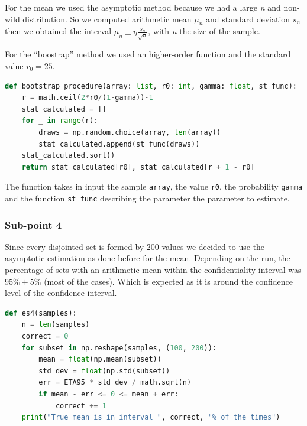\documentclass[10pt,a4paper]{article}
\begin{document}
For the mean we used the asymptotic method because we had a large \emph{n} and non-wild distribution. So we computed arithmetic mean \(\mu_{n}\) and standard deviation \(s_{n}\) then we obtained the interval \(\mu_{n}\pm \eta\frac{s_{n}}{\sqrt{n}}\), with \emph{n} the size of the sample.

For the ``boostrap'' method we used an higher-order function and the standard value \(r_{0} = 25\).
\begin{lstlisting}[language=python]
def bootstrap_procedure(array: list, r0: int, gamma: float, st_func):
    r = math.ceil(2*r0/(1-gamma))-1
    stat_calculated = []
    for _ in range(r):
        draws = np.random.choice(array, len(array))
        stat_calculated.append(st_func(draws))
    stat_calculated.sort()
    return stat_calculated[r0], stat_calculated[r + 1 - r0]
\end{lstlisting}
The function takes in input the sample \texttt{array}, the value \texttt{r0}, the probability \texttt{gamma} and the function \texttt{st\_func} describing the parameter the parameter to estimate.

\subsubsection*{Sub-point 4}

Since every disjointed set is formed by \(200\) values we decided to use the asymptotic estimation as done before for the mean. Depending on the run, the percentage of sets with an arithmetic mean within the confidentiality interval was \(95\%\pm5\%\) (most of the cases). Which is expected as it is around the confidence level of the confidence interval.
\begin{lstlisting}[language=python]
def es4(samples):
    n = len(samples)
    correct = 0
    for subset in np.reshape(samples, (100, 200)):
        mean = float(np.mean(subset))
        std_dev = float(np.std(subset))
        err = ETA95 * std_dev / math.sqrt(n)
        if mean - err <= 0 <= mean + err:
            correct += 1
    print("True mean is in interval ", correct, "% of the times")
\end{lstlisting}
\end{document}
